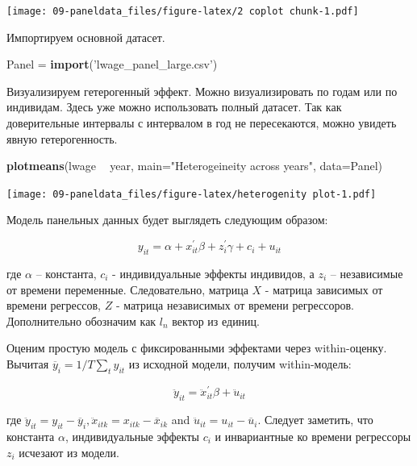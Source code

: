 \documentclass[]{book}
\newenvironment{Shaded}{\begin{snugshade}}{\end{snugshade}}
\newcommand{\DataTypeTok}[1]{\textcolor[rgb]{0.13,0.29,0.53}{#1}}
\newcommand{\KeywordTok}[1]{\textcolor[rgb]{0.13,0.29,0.53}{\textbf{#1}}}
\newcommand{\NormalTok}[1]{#1}
\newcommand{\OperatorTok}[1]{\textcolor[rgb]{0.81,0.36,0.00}{\textbf{#1}}}
\newcommand{\StringTok}[1]{\textcolor[rgb]{0.31,0.60,0.02}{#1}}
\begin{document}
\texttt{[image: 09-paneldata\_files/figure-latex/2 coplot chunk-1.pdf]}

Импортируем основной датасет.

\begin{Shaded}
\begin{Highlighting}[]
\NormalTok{Panel =}\StringTok{ }\KeywordTok{import}\NormalTok{(}\StringTok{'lwage_panel_large.csv'}\NormalTok{)}
\end{Highlighting}
\end{Shaded}

Визуализируем гетерогенный эффект. Можно визуализировать по годам или по индивидам. Здесь уже можно использовать полный датасет. Так как доверительные интервалы с интервалом в год не пересекаются, можно увидеть явную гетерогенность.

\begin{Shaded}
\begin{Highlighting}[]
\KeywordTok{plotmeans}\NormalTok{(lwage }\OperatorTok{~}\StringTok{ }\NormalTok{year, }\DataTypeTok{main=}\StringTok{"Heterogeineity across years"}\NormalTok{, }\DataTypeTok{data=}\NormalTok{Panel)}
\end{Highlighting}
\end{Shaded}

\texttt{[image: 09-paneldata\_files/figure-latex/heterogenity plot-1.pdf]}

Модель панельных данных будет выглядеть следующим образом:

\begin{equation}
y_{i t}=\alpha+x_{i t}^{\prime} \beta+z_{i}^{\prime} \gamma+c_{i}+u_{i t}
\end{equation}

где \(\alpha\) -- константа, \(c_{i}\) - индивидуальные эффекты индивидов, а \(z_i\) -- независимые от времени переменные. Следовательно, матрица \(X\) - матрица зависимых от времени регрессов, \(Z\) - матрица независимых от времени регрессоров. Дополнительно обозначим как \(l_n\) вектор из единиц.

Оценим простую модель с фиксированными эффектами через within-оценку. Вычитая \(\overline{y}_{i}=1 / T \sum_{t} y_{i t}\) из исходной модели, получим within-модель:

\begin{equation}
\ddot{y}_{i t}=\ddot{x}_{i t}^{\prime} \beta+\ddot{u}_{i t}
\end{equation}

где \(\ddot{y}_{i t}=y_{i t}-\overline{y}_{i}, \ddot{x}_{i t k}=x_{i t k}-\overline{x}_{i k}\) and \(\ddot{u}_{i t}=u_{i t}-\overline{u}_{i}\). Следует заметить, что константа \(\alpha\), индивидуальные эффекты \(c_i\) и инвариантные ко времени регрессоры \(z_i\) исчезают из модели.
\end{document}
